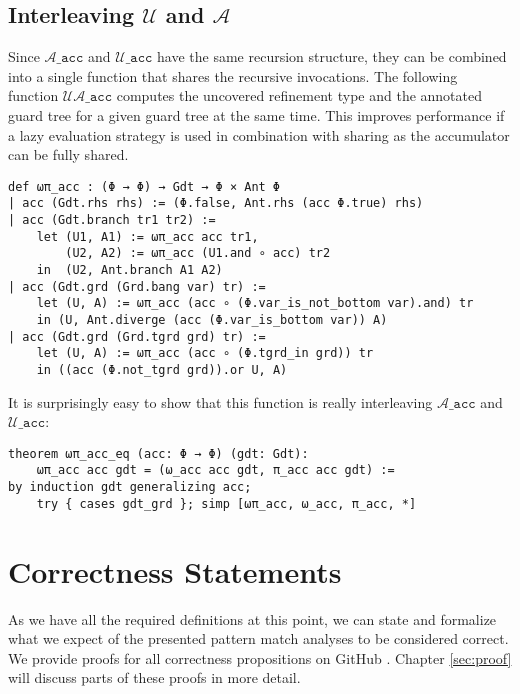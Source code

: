 \subsection{Interleaving $\mathcal{U}$ and $\mathcal{A}$}
\label{sec:formalizationInterleaving}

Since $\mathcal{A}\mathtt{\_acc}$ and $\mathcal{U}\mathtt{\_acc}$ have
the same recursion structure, they can be combined into a single function that shares the recursive invocations.
The following function $\mathcal{UA}\mathtt{\_acc}$ computes the uncovered refinement type and the annotated guard tree for a given guard tree at the same time.
This improves performance if a lazy evaluation strategy is used in combination with sharing as the accumulator can be fully shared.

\begin{verbatim}
def ωπ_acc : (Φ → Φ) → Gdt → Φ × Ant Φ
| acc (Gdt.rhs rhs) := (Φ.false, Ant.rhs (acc Φ.true) rhs)
| acc (Gdt.branch tr1 tr2) :=
    let (U1, A1) := ωπ_acc acc tr1,
        (U2, A2) := ωπ_acc (U1.and ∘ acc) tr2
    in  (U2, Ant.branch A1 A2)
| acc (Gdt.grd (Grd.bang var) tr) :=
    let (U, A) := ωπ_acc (acc ∘ (Φ.var_is_not_bottom var).and) tr
    in (U, Ant.diverge (acc (Φ.var_is_bottom var)) A)
| acc (Gdt.grd (Grd.tgrd grd) tr) := 
    let (U, A) := ωπ_acc (acc ∘ (Φ.tgrd_in grd)) tr
    in ((acc (Φ.not_tgrd grd)).or U, A)
\end{verbatim}

It is surprisingly easy to show that this function is really interleaving $\mathcal{A}\mathtt{\_acc}$ and $\mathcal{U}\mathtt{\_acc}$:

\begin{verbatim}
theorem ωπ_acc_eq (acc: Φ → Φ) (gdt: Gdt):
    ωπ_acc acc gdt = (ω_acc acc gdt, π_acc acc gdt) :=
by induction gdt generalizing acc;
    try { cases gdt_grd }; simp [ωπ_acc, ω_acc, π_acc, *]
\end{verbatim}


\section{Correctness Statements}
\label{sec:formalizationCorrectnessStmts}

As we have all the required definitions at this point, we can state and formalize what we expect of the presented pattern match analyses to be considered correct.
We provide proofs for all correctness propositions on GitHub \cite{leanProof}. Chapter \ref{sec:proof} will discuss parts of these proofs in more detail.

